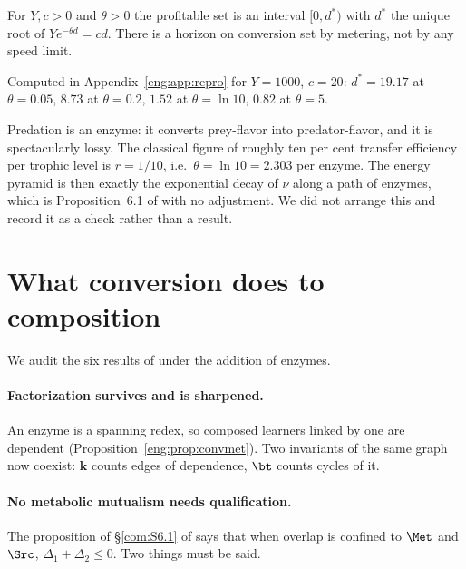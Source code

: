 \begin{proposition}\label{eng:prop:radius}
For $Y, c > 0$ and $\theta > 0$ the profitable set is an interval
$[0, d^\ast)$ with $d^\ast$ the unique root of $Y e^{-\theta d} = cd$.
There is a horizon on conversion set by metering, not by any speed limit.
\end{proposition}

Computed in Appendix~\ref{eng:app:repro} for $Y = 1000$, $c = 20$: $d^\ast =
19.17$ at $\theta = 0.05$, $8.73$ at $\theta = 0.2$, $1.52$ at $\theta =
\ln 10$, $0.82$ at $\theta = 5$.

\begin{remark}\label{eng:ecological-pyramid}
Predation is an enzyme: it converts prey-flavor into predator-flavor, and
it is spectacularly lossy. The classical figure of roughly ten per cent
transfer efficiency per trophic level \cite{lindeman} is
$r = 1/10$, i.e.\ $\theta = \ln 10 = 2.303$ per enzyme. The energy pyramid
is then exactly the exponential decay of $\nu$ along a path of enzymes,
which is Proposition~6.1 of \cite{vtok} with no adjustment. We did not
arrange this and record it as a check rather than a result.
\end{remark}

\section{What conversion does to composition}\label{eng:S7}
\label{eng:sec:audit}

We audit the six results of \chComp under the addition of enzymes.

\paragraph{Factorization survives and is sharpened.} An enzyme is a
spanning redex, so composed learners linked by one are dependent
(Proposition~\ref{eng:prop:convmet}). Two invariants of the same graph now
coexist: $\mathbf{k}$ counts edges of dependence, $\bt$ counts cycles of
it.

\paragraph{No metabolic mutualism needs qualification.} The proposition of
\S\ref{com:S6.1} of \chComp says that when overlap is confined to $\Met$ and
$\Src$, $\Delta_1 + \Delta_2 \leq 0$. Two things must be said.

